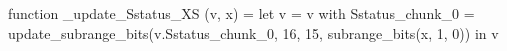 function _update_Sstatus_XS (v, x) = let v = { v with Sstatus_chunk_0 = update_subrange_bits(v.Sstatus_chunk_0, 16, 15, subrange_bits(x, 1, 0)) } in
  v
